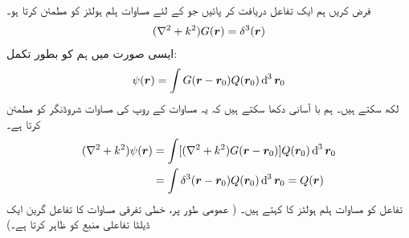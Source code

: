 فرض کریں ہم ایک تفاعل  دریافت کر پائیں جو    کے لئے مساوات ہلم ہولٹز کو مطمئن کرتا ہو۔
\begin{align}\label{مساوات_بکھراو_ہلم_ہولٹز_ڈلٹا}
	(\nabla^2+k^2)G({{\boldsymbol{r}}})=\delta^3({{\boldsymbol{r}}})
\end{align}
ایسی صورت میں ہم  کو بطور  تکمل:
\begin{align}\label{مساوات_بکھراو_سائے_بطور_تکمل}
	\psi(\kvec{r})=\int G(\kvec{r}-\kvec{r}_0)Q(\kvec{r}_0)\dif^{\,3}\kvec{r}_0
\end{align}
 لکھ سکتے ہیں۔ ہم با آسانی دکھا سکتے ہیں کہ یہ مساوات  کے   روپ کی مساوات شروڈنگر کو مطمئن کرتا ہے۔
\begin{align*}
(\nabla^2+k^2)\psi(\kvec{r}) &= \int[(\nabla^2+k^2)G(\kvec{r}-\kvec{r}_0)]Q(\kvec{r}_0)\dif^{\,3}\kvec{r}_0 \\
	&= \int\delta^3(\kvec{r}-\kvec{r}_0)Q(\kvec{r}_0)\dif^{\,3}\kvec{r}_0 = Q(\kvec{r})
\end{align*}
تفاعل  کو مساوات ہلم ہولٹز کا   کہتے ہیں۔ ( عمومی طور پر،   خطی تفرقی مساوات کا تفاعل گرین  ایک ڈیلٹا تفاعلی منبع کو   ظاہر کرتا ہے۔)

